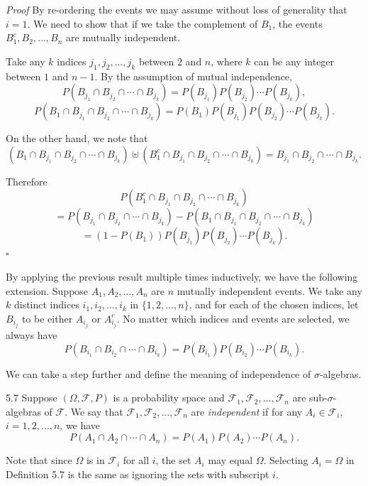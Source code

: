 \textit{Proof} By re-ordering the events we may assume without loss of generality that $i=1$. We need to show that if we take the complement of $B_1$, the events $B_1^c,B_2,\ldots,B_n$ are mutually independent.

Take any $k$ indices $j_1,j_2,\ldots,j_k$ between $2$ and $n$, where $k$ can be any integer between $1$ and $n-1$. By the assumption of mutual independence,
\[
P(B_{j_1} \cap B_{j_2} \cap \cdots \cap B_{j_k})=P(B_{j_1})P(B_{j_2})\cdots P(B_{j_k}),
\]
\[
P(B_1 \cap B_{j_1} \cap B_{j_2} \cap \cdots \cap B_{j_k})=P(B_1)P(B_{j_1})P(B_{j_2})\cdots P(B_{j_k}).
\]

On the other hand, we note that
\[
(B_1 \cap B_{j_1} \cap B_{j_2} \cap \cdots \cap B_{j_k}) \uplus (B_1^c \cap B_{j_1} \cap B_{j_2} \cap \cdots \cap B_{j_k}) = B_{j_1} \cap B_{j_2} \cap \cdots \cap B_{j_k}.
\]

Therefore
\[
P(B_1^c \cap B_{j_1} \cap B_{j_2} \cap \cdots \cap B_{j_k})
\]
\[
= P(B_{j_1} \cap B_{j_2} \cap \cdots \cap B_{j_k})-P(B_1 \cap B_{j_1} \cap B_{j_2} \cap \cdots \cap B_{j_k})
\]
\[
= (1-P(B_1))P(B_{j_1})P(B_{j_2})\cdots P(B_{j_k}).
\]
\hfill $\square$

By applying the previous result multiple times inductively, we have the following extension. Suppose $A_1,A_2,\ldots,A_n$ are $n$ mutually independent events. We take any $k$ distinct indices $i_1,i_2,\ldots,i_k$ in $\{1,2,\ldots,n\}$, and for each of the chosen indices, let $B_{i_j}$ to be either $A_{i_j}$ or $A_{i_j}^c$. No matter which indices and events are selected, we always have
\begin{equation}
P(B_{i_1} \cap B_{i_2} \cap \cdots \cap B_{i_k})=P(B_{i_1})P(B_{i_2})\cdots P(B_{i_k}).
\tag{5.4}
\end{equation}

We can take a step further and define the meaning of independence of $\sigma$-algebras.

\begin{defbox}{5.7}
Suppose $(\Omega,\mathcal{F},P)$ is a probability space and $\mathcal{F}_1,\mathcal{F}_2,\ldots,\mathcal{F}_n$ are sub-$\sigma$-algebras of $\mathcal{F}$. We say that $\mathcal{F}_1,\mathcal{F}_2,\ldots,\mathcal{F}_n$ are \textit{independent} if for any $A_i \in \mathcal{F}_i$, $i=1,2,\ldots,n$, we have
\[
P(A_1 \cap A_2 \cap \cdots \cap A_n)=P(A_1)P(A_2)\cdots P(A_n).
\]
\end{defbox}

Note that since $\Omega$ is in $\mathcal{F}_i$ for all $i$, the set $A_i$ may equal $\Omega$. Selecting $A_i=\Omega$ in Definition 5.7 is the same as ignoring the sets with subscript $i$.

